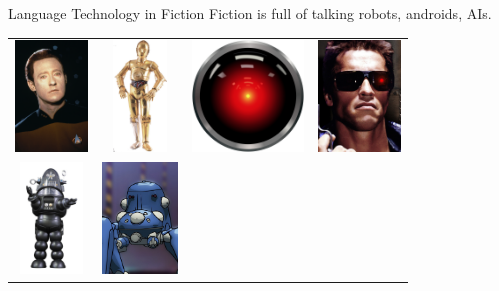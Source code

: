 \documentclass[xcolor={usenames,svgnames,x11names,dvipsnames,table}]{beamer}
\begin{document}
\begin{frame}{Language Technology in Fiction}
    Fiction is full of talking robots, androids, AIs.
    \begin{center}
        \begin{tabular}{cccc}
            \includegraphics[height=8em]{./img/data} &
            \includegraphics[height=8em]{./img/c3po} &
            \includegraphics[height=8em]{./img/hal9000} &
            \includegraphics[height=8em]{./img/terminator} \\
            \includegraphics[height=8em]{./img/robby} &
            \includegraphics[height=8em]{./img/tachikoma} &

\end{tabular}
\end{center}
\end{frame}
\end{document}
